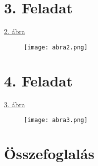 \documentclass[a4paper,12pt]{article}
\begin{document}
\section{3. Feladat}



\hyperref[fig:fig2]{2. ábra}
\begin{figure}[H]
\caption{}
        \centering
        \texttt{[image: abra2.png]}
\label{fig:fig2}
\end{figure}


\section{4. Feladat}

\hyperref[fig:fig3]{3. ábra}
\begin{figure}[H]
\caption{}
        \centering
        \texttt{[image: abra3.png]}
\label{fig:fig3}
\end{figure}
\section{Összefoglalás}



\newpage


\end{document}
